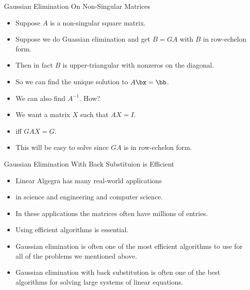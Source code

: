 \documentclass{beamer}
\begin{document}
\begin{frame}{Gaussian Elimination On Non-Singular Matrices}

\begin{itemize}
\item Suppose $A$ is a non-singular square matrix.
\item Suppose we do Guassian elimination and get $B=G A$ with $B$ in
row-echelon form.
\item Then in fact $B$ is upper-triangular with nonzeros on the diagonal.
\item So we can find the unique solution to $A\bx=\bb$.
\item We can also find $A^{-1}$. How?
\item We want a matrix $X$ such that $AX = I$.
\item iff $GA X = G$.
\item This will be easy to solve since $GA$ is in row-echelon form.
\end{itemize}
\end{frame}


\begin{frame}{Gaussian Elimination With Back Substituion is Efficient}

\begin{itemize}
\item Linear Algegra has many real-world applications
\item in science and engineering and computer science.
\item In these applications the matrices often have millions of entries.
\item Using efficient algorithms is essential.
\item Gaussian elimination is often one of the most efficient algorithms
to use for all of the problems we mentioned above.
\item Gaussian elimination with back substitution is often one of the
best algorithms for solving large systems of linear equations.
\end{itemize}
\end{frame}

\end{document}
